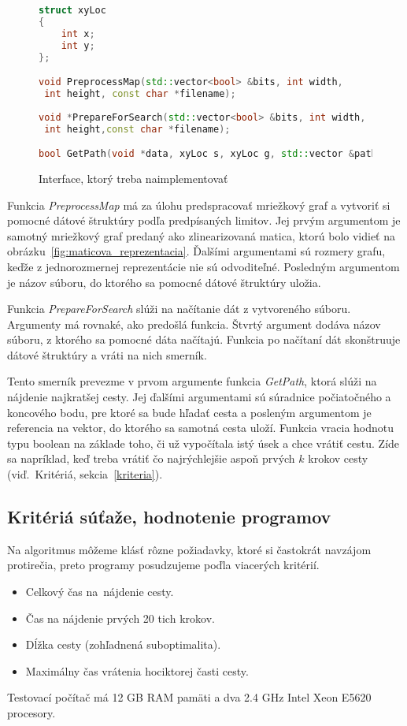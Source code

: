 \begin{figure}
\begin{lstlisting}[language=C++]
struct xyLoc 
{
    int x;
    int y;
};

void PreprocessMap(std::vector<bool> &bits, int width,
 int height, const char *filename);
                   
void *PrepareForSearch(std::vector<bool> &bits, int width,
 int height,const char *filename);

bool GetPath(void *data, xyLoc s, xyLoc g, std::vector &path);
\end{lstlisting}
\caption{Interface, ktorý treba naimplementovať}
\label{fig:interface}
\end{figure}
Funkcia \emph{PreprocessMap} má za úlohu predspracovať
mriežkový graf a vytvoriť si pomocné dátové štruktúry podľa predpísaných limitov. Jej prvým argumentom 
je samotný mriežkový graf predaný ako zlinearizovaná matica, ktorú bolo vidieť na obrázku~\ref{fig:maticova_reprezentacia}. Ďalšími argumentami sú rozmery grafu,
keďže z jednorozmernej reprezentácie nie sú odvoditeľné. Posledným argumentom je názov súboru, do ktorého sa pomocné dátové štruktúry uložia.

Funkcia \emph{PrepareForSearch} slúži na načítanie dát z vytvoreného súboru. Argumenty má rovnaké, ako predošlá funkcia. Štvrtý argument
dodáva názov súboru, z ktorého sa pomocné dáta načítajú. Funkcia po načítaní dát skonštruuje dátové štruktúry a vráti na nich smerník.

Tento smerník prevezme v prvom argumente funkcia \emph{GetPath}, ktorá slúži na nájdenie najkratšej cesty. Jej ďalšími argumentami
sú súradnice počiatočného a koncového bodu, pre ktoré sa bude hľadať cesta a posleným argumentom je referencia na vektor, do ktorého sa samotná cesta uloží. Funkcia vracia hodnotu typu boolean na základe toho, či už vypočítala istý úsek a chce vrátiť cestu. Zíde sa napríklad, keď treba vrátiť čo najrýchlejšie aspoň prvých $k$ krokov cesty (viď.~Kritériá, sekcia~\ref{kriteria}).



\subsection{Kritériá súťaže, hodnotenie programov}
Na algoritmus môžeme klásť rôzne požiadavky, ktoré si častokrát navzájom protirečia, preto programy posudzujeme poďla viacerých kritérií.
\label{kriteria}
\begin{itemize}
\item Celkový čas na~nájdenie cesty.
\item Čas na nájdenie prvých 20 tich krokov.
\item Dĺžka cesty (zohľadnená suboptimalita).
\item Maximálny čas vrátenia hociktorej časti cesty.
\end{itemize}

Testovací počítač má 12 GB RAM pamäti a dva 2.4 GHz Intel Xeon E5620
procesory.